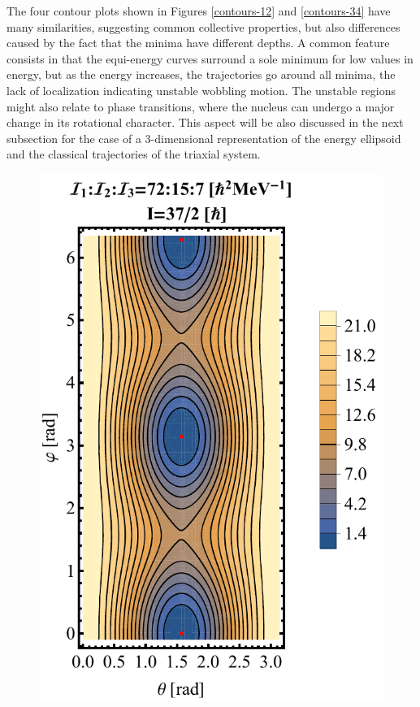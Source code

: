 \documentclass[11pt]{article}
\begin{document}
The four contour plots shown in Figures \ref{contours-12} and \ref{contours-34} have many similarities, suggesting common collective properties, but also differences caused by the fact that the minima have different depths. A common feature consists in that the equi-energy curves surround a sole minimum for low values in energy, but as the energy increases, the trajectories go around all minima, the lack of localization indicating unstable wobbling motion. The unstable regions might also relate to phase transitions, where the nucleus can undergo a major change in its rotational character. This aspect will be also discussed in the next subsection for the case of a 3-dimensional representation of the energy ellipsoid and the classical trajectories of the triaxial system.

\begin{figure}
\centering
\begin{minipage}{.5\textwidth}
  \centering
  \includegraphics[scale=0.5]{figs/contour-tsd3.pdf}

\end{minipage}
\end{figure}
\end{document}
